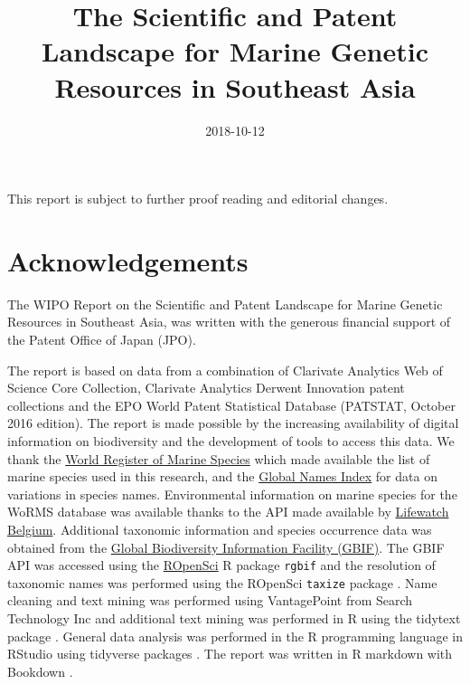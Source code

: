\documentclass[]{book}
\title{The Scientific and Patent Landscape for Marine Genetic Resources in
Southeast Asia}
\date{2018-10-12}
\theoremstyle{definition}
\theoremstyle{definition}
\theoremstyle{definition}
\theoremstyle{remark}
\begin{document}
\maketitle

{
\setcounter{tocdepth}{1}
\tableofcontents
}
\hypertarget{section}{%
\chapter*{}\label{section}}

This report is subject to further proof reading and editorial changes.

\hypertarget{acknowledgements}{%
\chapter*{Acknowledgements}\label{acknowledgements}}

The WIPO Report on the Scientific and Patent Landscape for Marine
Genetic Resources in Southeast Asia, was written with the generous
financial support of the Patent Office of Japan (JPO).

The report is based on data from a combination of Clarivate Analytics
Web of Science Core Collection, Clarivate Analytics Derwent Innovation
patent collections and the EPO World Patent Statistical Database
(PATSTAT, October 2016 edition). The report is made possible by the
increasing availability of digital information on biodiversity and the
development of tools to access this data. We thank the
\href{http://www.marinespecies.org/}{World Register of Marine Species}
which made available the list of marine species used in this research,
and the \href{http://gni.globalnames.org/}{Global Names Index} for data
on variations in species names. Environmental information on marine
species for the WoRMS database was available thanks to the API made
available by
\href{http://www.lifewatch.be/data-services/?cache=1521050271}{Lifewatch
Belgium}. Additional taxonomic information and species occurrence data
was obtained from the \href{https://www.gbif.org/}{Global Biodiversity
Information Facility (GBIF)}. The GBIF API was accessed using the
\href{https://ropensci.org/}{ROpenSci} R package \texttt{rgbif} and the
resolution of taxonomic names was performed using the ROpenSci
\texttt{taxize} package \citep{R-rgbif, R-taxize}. Name cleaning and
text mining was performed using VantagePoint from Search Technology Inc
and additional text mining was performed in R using the tidytext package
\citep{R-tidytext}. General data analysis was performed in the R
programming language in RStudio using tidyverse packages
\citep{R-base, R-tidyverse}. The report was written in R markdown with
Bookdown \citep{R-rmarkdown, R-bookdown}.
\end{document}
